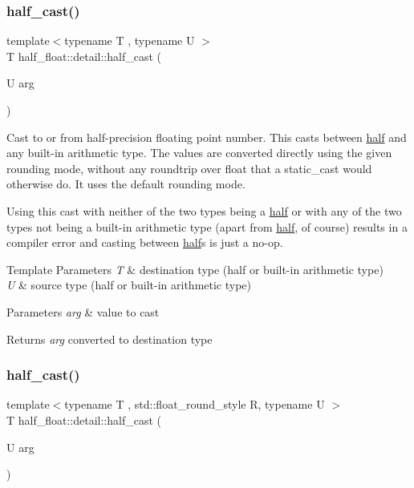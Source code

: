 \subsubsection{\texorpdfstring{half\+\_\+cast()}{half\_cast()}\hspace{0.1cm}{\footnotesize\ttfamily [1/2]}}
{\footnotesize\ttfamily template$<$typename T , typename U $>$ \\
T half\+\_\+float\+::detail\+::half\+\_\+cast (\begin{DoxyParamCaption}\item[{U}]{arg }\end{DoxyParamCaption})}

Cast to or from half-\/precision floating point number. This casts between \hyperlink{classhalf__float_1_1half}{half} and any built-\/in arithmetic type. The values are converted directly using the given rounding mode, without any roundtrip over {\ttfamily float} that a {\ttfamily static\+\_\+cast} would otherwise do. It uses the default rounding mode.

Using this cast with neither of the two types being a \hyperlink{classhalf__float_1_1half}{half} or with any of the two types not being a built-\/in arithmetic type (apart from \hyperlink{classhalf__float_1_1half}{half}, of course) results in a compiler error and casting between \hyperlink{classhalf__float_1_1half}{half}s is just a no-\/op. 
\begin{DoxyTemplParams}{Template Parameters}
{\em T} & destination type (half or built-\/in arithmetic type) \\
\hline
{\em U} & source type (half or built-\/in arithmetic type) \\
\hline
\end{DoxyTemplParams}

\begin{DoxyParams}{Parameters}
{\em arg} & value to cast \\
\hline
\end{DoxyParams}
\begin{DoxyReturn}{Returns}
{\itshape arg} converted to destination type 
\end{DoxyReturn}
\mbox{\label{namespacehalf__float_1_1detail_aa886fe2fe51f0ead5eca42060889b331}} 
\subsubsection{\texorpdfstring{half\+\_\+cast()}{half\_cast()}\hspace{0.1cm}{\footnotesize\ttfamily [2/2]}}
{\footnotesize\ttfamily template$<$typename T , std\+::float\+\_\+round\+\_\+style R, typename U $>$ \\
T half\+\_\+float\+::detail\+::half\+\_\+cast (\begin{DoxyParamCaption}\item[{U}]{arg }\end{DoxyParamCaption})}

